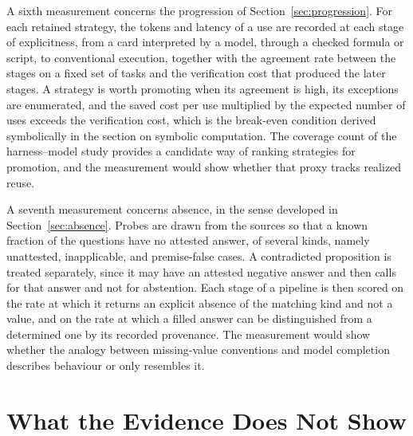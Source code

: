 \documentclass[11pt]{article}
\theoremstyle{remark}
\begin{document}
A sixth measurement concerns the progression of Section~\ref{sec:progression}. For each retained strategy, the tokens and latency of a use are recorded at each stage of explicitness, from a card interpreted by a model, through a checked formula or script, to conventional execution, together with the agreement rate between the stages on a fixed set of tasks and the verification cost that produced the later stages. A strategy is worth promoting when its agreement is high, its exceptions are enumerated, and the saved cost per use multiplied by the expected number of uses exceeds the verification cost, which is the break-even condition derived symbolically in the section on symbolic computation. The coverage count of the harness--model study provides a candidate way of ranking strategies for promotion, and the measurement would show whether that proxy tracks realized reuse.

A seventh measurement concerns absence, in the sense developed in Section~\ref{sec:absence}. Probes are drawn from the sources so that a known fraction of the questions have no attested answer, of several kinds, namely unattested, inapplicable, and premise-false cases. A contradicted proposition is treated separately, since it may have an attested negative answer and then calls for that answer and not for abstention. Each stage of a pipeline is then scored on the rate at which it returns an explicit absence of the matching kind and not a value, and on the rate at which a filled answer can be distinguished from a determined one by its recorded provenance. The measurement would show whether the analogy between missing-value conventions and model completion describes behaviour or only resembles it.

\section{What the Evidence Does Not Show}
\end{document}

